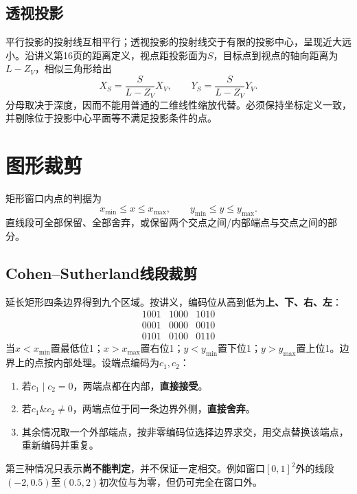 \subsection{透视投影}
平行投影的投射线互相平行；透视投影的投射线交于有限的投影中心，呈现近大远小。沿讲义第16页的距离定义，视点距投影面为$S$，目标点到视点的轴向距离为$L-Z_V$，相似三角形给出
\[
X_S=\frac{S}{L-Z_V}X_V,\qquad
Y_S=\frac{S}{L-Z_V}Y_V.
\]
分母取决于深度，因而不能用普通的二维线性缩放代替。必须保持坐标定义一致，并剔除位于投影中心平面等不满足投影条件的点。

\section{图形裁剪}

矩形窗口内点的判据为
\[
x_{\min}\leq x\leq x_{\max},\qquad y_{\min}\leq y\leq y_{\max}.
\]
直线段可全部保留、全部舍弃，或保留两个交点之间/内部端点与交点之间的部分。

\subsection{Cohen--Sutherland线段裁剪}
延长矩形四条边界得到九个区域。按讲义，编码位从高到低为\textbf{上、下、右、左}：
\[
\begin{array}{c|c|c}
1001&1000&1010\\\hline
0001&0000&0010\\\hline
0101&0100&0110
\end{array}
\]
当$x<x_{\min}$置最低位1；$x>x_{\max}$置右位1；$y<y_{\min}$置下位1；$y>y_{\max}$置上位1。边界上的点按内部处理。设端点编码为$c_1,c_2$：
\begin{enumerate}
\item 若$c_1\mathbin{|}c_2=0$，两端点都在内部，\textbf{直接接受}。
\item 若$c_1\mathbin{\&}c_2\ne0$，两端点位于同一条边界外侧，\textbf{直接舍弃}。
\item 其余情况取一个外部端点，按非零编码位选择边界求交，用交点替换该端点，重新编码并重复。
\end{enumerate}
第三种情况只表示\textbf{尚不能判定}，并不保证一定相交。例如窗口$[0,1]^2$外的线段$(-2,0.5)$至$(0.5,2)$初次位与为零，但仍可完全在窗口外。

